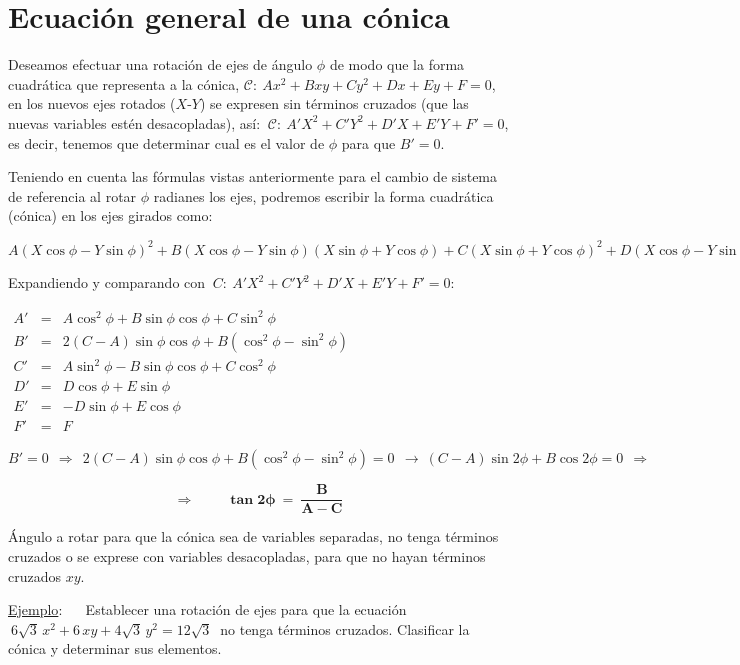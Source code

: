 \section{Ecuación general de una cónica}

Deseamos efectuar una rotación de ejes de ángulo $\phi$ de modo que la forma cuadrática que representa a la cónica, $\mathcal C:\ Ax^2+Bxy+Cy^2+Dx+Ey+F=0$, en los nuevos ejes rotados ($X$-$Y$) se expresen sin términos cruzados (que las nuevas variables estén desacopladas), así: $\ \mathcal C:\ A'X^2+C'Y^2+D'X+E'Y+F'=0$, es decir, tenemos que determinar cual es el valor de $\phi$ para que $B'=0$.


Teniendo en cuenta las fórmulas vistas anteriormente para el cambio de sistema de referencia al rotar $\phi$ radianes los ejes, podremos escribir la forma cuadrática (cónica) en los ejes girados como:

$A(X\cos \phi-Y\sin \phi)^2+B(X\cos \phi-Y\sin \phi)(X\sin \phi+Y\cos \phi)+C(X\sin \phi+Y\cos \phi)^2+D(X\cos \phi-Y\sin \phi)+E(X\sin \phi+Y\cos \phi)+F=0$

Expandiendo y comparando con $\ C:\ A'X^2+C'Y^2+D'X+E'Y+F'=0$:

\vspace{5mm}
\begin{center}
$\begin{array}{lcl}
	A'&=&A\cos^2 \phi+B\sin \phi \cos \phi + C\sin^2 \phi \\
	B'&=&2(C-A)\sin \phi \cos \phi +B (\cos^2 \phi-\sin^2 \phi) \\
	C'&=&A\sin^2 \phi-B\sin \phi \cos \phi + C\cos^2 \phi \\
	D'&=&D\cos \phi+E\sin \phi \\
	E'&=&-D\sin \phi+E\cos \phi \\
	F'&=&F
 \end{array}$	
\end{center}
\vspace{5mm}

$B'=0 \ \ \Rightarrow \ \ 2(C-A)\sin \phi \cos \phi +B (\cos^2 \phi-\sin^2 \phi)=0 \ \ \to \  (C-A)\sin 2\phi
+B\cos 2\phi=0 \ \ \Rightarrow  $


$$\Rightarrow \qquad \boxed{ \ \boldsymbol{ \tan 2\phi \ = \ \dfrac{B}{A-C}} \ }$$


Ángulo a rotar para que la cónica sea de variables separadas, no tenga términos cruzados o se exprese con variables desacopladas, para que no hayan términos cruzados $xy$.

\vspace{10mm} \underline{Ejemplo}: $\quad$ Establecer una rotación de ejes para que la ecuación $\ 6\sqrt{3}\, x^2+6\, xy+4	\sqrt{3}\, y^2=12\sqrt{3}\ $ no tenga términos cruzados. Clasificar la cónica y determinar sus elementos.

